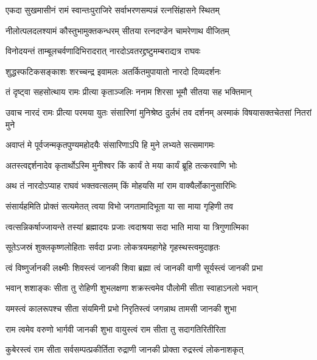 


\twolineshloka
{एकदा सुखमासीनं रामं स्वान्तःपुराजिरे}
{सर्वाभरणसम्पन्नं रत्नसिंहासने स्थितम्} %

\twolineshloka
{नीलोत्पलदलश्यामं कौस्तुभामुक्तकन्धरम्}
{सीतया रत्नदण्डेन चामरेणाथ वीजितम्} %

\twolineshloka
{विनोदयन्तं ताम्बूलचर्वणादिभिरादरात्}
{नारदोऽवतरद्द्रष्टुमम्बराद्यत्र राघवः} %

\twolineshloka
{शुद्धस्फटिकसङ्काशः शरच्चन्द्र इवामलः}
{अतर्कितमुपायातो नारदो दिव्यदर्शनः} %

\twolineshloka
{तं दृष्ट्वा सहसोत्थाय रामः प्रीत्या कृताञ्जलिः}
{ननाम शिरसा भूमौ सीतया सह भक्तिमान्} %

\threelineshloka
{उवाच नारदं रामः प्रीत्या परमया युतः}
{संसारिणां मुनिश्रेष्ठ दुर्लभं तव दर्शनम्}
{अस्माकं विषयासक्तचेतसां नितरां मुने} %

\twolineshloka
{अवाप्तं मे पूर्वजन्मकृतपुण्यमहोदयैः}
{संसारिणाऽपि हि मुने लभ्यते सत्समागमः} %

\twolineshloka
{अतस्त्वद्दर्शनादेव कृतार्थोऽस्मि मुनीश्वर}
{किं कार्यं ते मया कार्यं ब्रूहि तत्करवाणि भोः} %

\twolineshloka
{अथ तं नारदोऽप्याह राघवं भक्तवत्सलम्}
{किं मोहयसि मां राम वाक्यैर्लोकानुसारिभिः} %

\twolineshloka
{संसार्यहमिति प्रोक्तं सत्यमेतत् त्वया विभो}
{जगतामादिभूता या सा माया गृहिणी तव} %

\twolineshloka
{त्वत्सन्निकर्षाज्जायन्ते तस्यां ब्रह्मादयः प्रजाः}
{त्वदाश्रया सदा भाति माया या त्रिगुणात्मिका} %

\twolineshloka
{सूतेऽजस्रं शुक्लकृष्णलोहिताः सर्वदा प्रजाः}
{लोकत्रयमहागेहे गृहस्थस्त्वमुदाहृतः} %

\twolineshloka
{त्वं विष्णुर्जानकी लक्ष्मीः शिवस्त्वं जानकी शिवा}
{ब्रह्मा त्वं जानकी वाणी सूर्यस्त्वं जानकी प्रभा} %

\twolineshloka
{भवान् शशाङ्कः सीता तु रोहिणी शुभलक्षणा}
{शक्रस्त्वमेव पौलोमी सीता स्वाहाऽनलो भवान्} %

\twolineshloka
{यमस्त्वं कालरूपश्च सीता संयमिनी प्रभो}
{निरृतिस्त्वं जगन्नाथ तामसी जानकी शुभा} %

\twolineshloka
{राम त्वमेव वरुणो भार्गवी जानकी शुभा}
{वायुस्त्वं राम सीता तु सदागतिरितीरिता} %

\twolineshloka
{कुबेरस्त्वं राम सीता सर्वसम्पत्प्रकीर्तिता}
{रुद्राणी जानकी प्रोक्ता रुद्रस्त्वं लोकनाशकृत्} %

